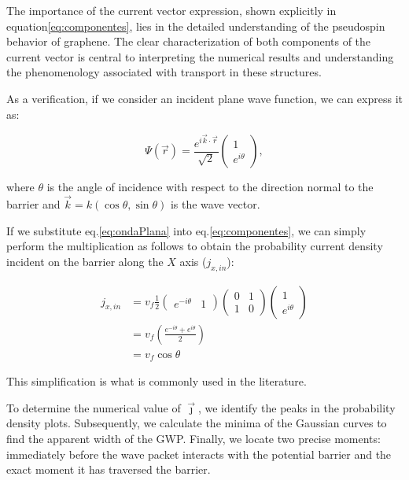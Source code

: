 The importance of the current vector expression, shown explicitly in equation\eqref{eq:componentes}, lies in the detailed understanding of the pseudospin behavior of graphene.
The clear characterization of both components of the current vector is central to interpreting the numerical results and understanding the phenomenology associated with transport in these structures.

As a verification, if we consider an incident plane wave function, we can express it as:

\begin{equation}
    \label{eq:ondaPlana}
    \Psi(\vec{r})=\frac{e^{i\vec{k}\cdot\vec{r}}}{\sqrt{2}}
    \begin{pmatrix}
        1 \\ e^{i\theta}
    \end{pmatrix},
\end{equation}

\noindent where $\theta$ is the angle of incidence with respect to the direction normal to the barrier and $\vec{k} = k(\cos\theta,\sin\theta)$ is the wave vector.

If we substitute eq.\eqref{eq:ondaPlana} into eq.\eqref{eq:componentes}, we can simply perform the multiplication as follows to obtain the probability current density incident on the barrier along the $X$ axis ($j_{x,in}$):

\begin{align}
    \label{eq:jdemostrada}
    j_{x, in}&=v_f\frac{1}{2}
    \begin{pmatrix}
        e^{-i\theta} & 1
    \end{pmatrix}
    \begin{pmatrix}
        0 & 1 \\
        1 & 0
    \end{pmatrix}
    \begin{pmatrix}
        1 \\ e^{i\theta}
    \end{pmatrix}\nonumber \\
    &=v_f\left( \frac{e^{-i\theta} + e^{i\theta}}{2} \right)\nonumber \\
    &=v_f\cos\theta
\end{align}

This simplification is what is commonly used in the literature\cite{DahalJPhysChemSolids2017, WuJAP2009}.

To determine the numerical value of $\vec{\jmath}$, we identify the peaks in the probability density plots.
Subsequently, we calculate the minima of the Gaussian curves to find the apparent width of the GWP. Finally, we locate two precise moments: immediately before the wave packet interacts with the potential barrier and the exact moment it has traversed the barrier.

